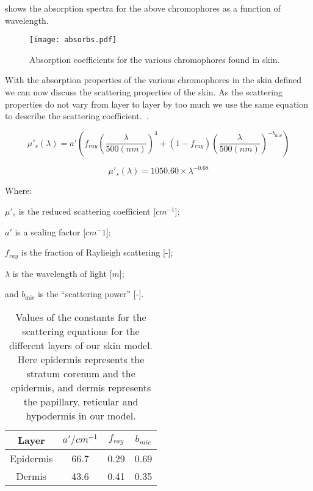  shows the absorption spectra for the above chromophores as a function of wavelength.

\begin{figure}[!htpb]
	\centering
	\texttt{[image: absorbs.pdf]}
	\caption{Absorption coefficients for the various chromophores found in skin.}
	\label{fig:absorcoeff}
\end{figure}

With the absorption properties of the various chromophores in the skin defined we can now discuss the scattering properties of the skin.
As the scattering properties do not vary from layer to layer by too much we use the same equation to describe the scattering coefficient.~\cite{jacques2013optical,iglesias2015biophysically,louisethesis}.

\begin{equation}
\mu'_s(\lambda)=a'\left(f_{ray}\left(\frac{\lambda}{500(nm)}\right)^4+(1-f_{ray})\left(\frac{\lambda}{500(nm)}\right)^{-b_{\text{mie}}}\right)
\label{eqn:scattrest}
\end{equation}

\begin{equation}
\mu'_s(\lambda)=1050.60\times\lambda^{-0.68}
\label{eqn:hyposcat}
\end{equation}


\noindent Where:

	$\mu'_s$ is the reduced scattering coefficient [$cm^{-1}$];

	$a'$ is a scaling factor [$cm^-1$];

	$f_{ray}$ is the fraction of Raylieigh scattering [-];

	$\lambda$ is the wavelength of light [$m$];

	and $b_{\text{mie}}$ is the ``scattering power'' [-].

\begin{table}[!htpb]
  \centering

  \begin{tabular}{|c|c|c|c|}
  \hline

  Layer & $a'/cm^{-1}$ & $f_{ray}$ & $b_{mie}$ \\
  \hline
   Epidermis         & 66.7 & 0.29 & 0.69 \\
   Dermis  & 43.6 & 0.41 & 0.35 \\

  \hline
  \end{tabular}
  \caption{Values of the constants for the scattering equations for the different layers of our skin model. Here epidermis represents the stratum corenum and the epidermis, and dermis represents the papillary, reticular and hypodermis in our model.}
  \label{tab:valscat}

\end{table}

